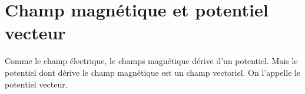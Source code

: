 
\section{Champ magnétique et potentiel vecteur}
%
Comme le champ électrique, le champs magnétique dérive d'un potentiel. Mais le potentiel dont dérive le champ magnétique est un champ vectoriel. On l'appelle le potentiel vecteur.


